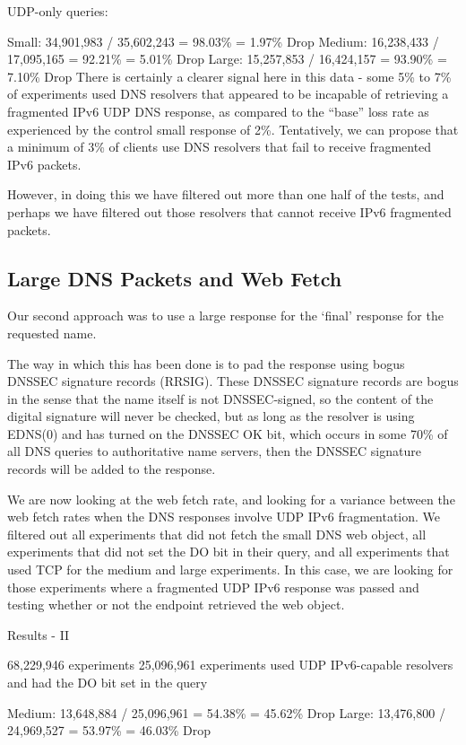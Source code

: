 UDP-only queries: 

Small:  34,901,983 / 35,602,243 = 98.03\% = 1.97\% Drop 
Medium: 16,238,433 / 17,095,165 = 92.21\% = 5.01\% Drop 
Large:  15,257,853 / 16,424,157 = 93.90\% = 7.10\% Drop 
There is certainly a clearer signal here in this data - some 5\% to 7\% of experiments used DNS resolvers that appeared to be incapable of retrieving a fragmented IPv6 UDP DNS response, as compared to the “base” loss rate as experienced by the control small response of 2\%. Tentatively, we can propose that a minimum of 3\% of clients use DNS resolvers that fail to receive fragmented IPv6 packets.

However, in doing this we have filtered out more than one half of the tests, and perhaps we have filtered out those resolvers that cannot receive IPv6 fragmented packets.

\subsection{Large DNS Packets and Web Fetch}

Our second approach was to use a large response for the ‘final’ response for the requested name.

The way in which this has been done is to pad the response using bogus DNSSEC signature records (RRSIG). These DNSSEC signature records are bogus in the sense that the name itself is not DNSSEC-signed, so the content of the digital signature will never be checked, but as long as the resolver is using EDNS(0) and has turned on the DNSSEC OK bit, which occurs in some 70\% of all DNS queries to authoritative name servers, then the DNSSEC signature records will be added to the response.

We are now looking at the web fetch rate, and looking for a variance between the web fetch rates when the DNS responses involve UDP IPv6 fragmentation. We filtered out all experiments that did not fetch the small DNS web object, all experiments that did not set the DO bit in their query, and all experiments that used TCP for the medium and large experiments. In this case, we are looking for those experiments where a fragmented UDP IPv6 response was passed and testing whether or not the endpoint retrieved the web object.

Results - II 

68,229,946 experiments 
25,096,961 experiments used UDP IPv6-capable resolvers
           and had the DO bit set in the query


Medium: 13,648,884 / 25,096,961 = 54.38\% = 45.62\% Drop 
Large:  13,476,800 / 24,969,527 = 53.97\% = 46.03\% Drop


